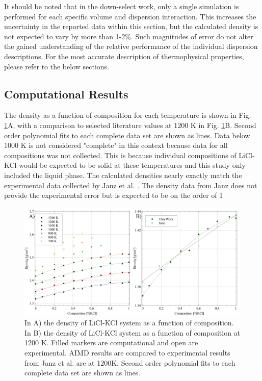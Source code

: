 \documentclass[review]{elsarticle}
\begin{document}
It should be noted that in the down-select work, only a single simulation is performed for each specific volume and dispersion interaction. This increases the uncertainty in the reported data within this section, but the calculated density is not expected to vary by more than 1-2\%. Such magnitudes of error do not alter the gained understanding of the relative performance of the individual dispersion descriptions. For the most accurate description of thermophysical properties, please refer to the below sections. 

\FloatBarrier

\subsection{Computational Results}

The density as a function of composition for each temperature is shown in Fig. \ref{fig:density}A, with a comparison to selected literature values at 1200 K in Fig. \ref{fig:density}B. Second order polynomial fits to each complete data set are shown as lines. Data below 1000 K is not considered "complete" in this context because data for all compositions was not collected. This is because individual compositions of LiCl-KCl would be expected to be solid at these temperatures and this study only included the liquid phase. The calculated densities nearly exactly match the experimental data collected by Janz et al. \cite{janz1975molten,van1955electrical}. The density data from Janz does not provide the experimental error but is expected to be on the order of 1%

\begin{figure}[h]
 \centering
 \includegraphics[width=1.0\textwidth]{images/denisty_combined_figures.jpg} 
 \caption{In A) the density of LiCl-KCl system as a function of composition. In B) the density of LiCl-KCl system as a function of composition at 1200 K. Filled markers are computational and open are experimental. AIMD results are compared to experimental results from Janz et al. \cite{janz1975molten,van1955electrical} are at 1200K. Second order polynomial fits to each complete data set are shown as lines.}
 \label{fig:density}
\end{figure} 
\end{document}
